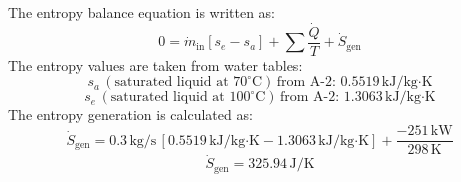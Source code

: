 The entropy balance equation is written as:  
\[
0 = \dot{m}_{\text{in}} [s_e - s_a] + \sum \frac{\dot{Q}}{T} + \dot{S}_{\text{gen}}
\]  
The entropy values are taken from water tables:  
\[
s_a \, (\text{saturated liquid at } 70^\circ\text{C}) \, \text{from A-2: } 0.5519 \, \text{kJ/kg·K}
\]  
\[
s_e \, (\text{saturated liquid at } 100^\circ\text{C}) \, \text{from A-2: } 1.3063 \, \text{kJ/kg·K}
\]  
The entropy generation is calculated as:  
\[
\dot{S}_{\text{gen}} = 0.3 \, \text{kg/s} \, [0.5519 \, \text{kJ/kg·K} - 1.3063 \, \text{kJ/kg·K}] + \frac{-251 \, \text{kW}}{298 \, \text{K}}
\]  
\[
\dot{S}_{\text{gen}} = 325.94 \, \text{J/K}
\]
